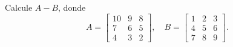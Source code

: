 \begin{ejercicio}
Calcule $A-B$, donde
\[
A=\begin{bmatrix} 10 & 9 & 8 \\ 7 & 6 & 5 \\ 4 & 3 & 2 \end{bmatrix}, \quad
B=\begin{bmatrix} 1 & 2 & 3 \\ 4 & 5 & 6 \\ 7 & 8 & 9 \end{bmatrix}.
\]
\end{ejercicio}
\muestraSolucion{
\[
A-B=\begin{bmatrix} 9 & 7 & 5 \\ 3 & 1 & -1 \\ -3 & -5 & -7 \end{bmatrix}.
\]
}